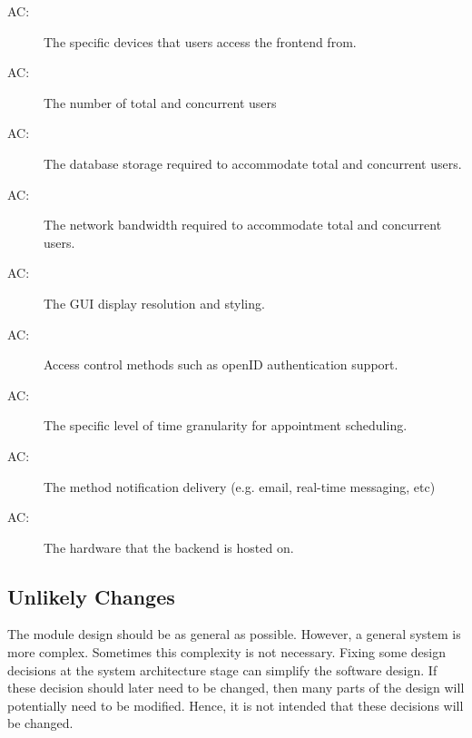 \documentclass[12pt, titlepage]{article}
\newcounter{acnum}
\newcommand{\actheacnum}{AC\theacnum}
\begin{document}
\begin{description}
\item[ \actheacnum \label{acDevice}:] The specific
  devices that users access the frontend from.
\item[ \actheacnum \label{acUsers}:] The number of total and concurrent users
\item[ \actheacnum \label{acStorage}:] The database storage required to accommodate total and concurrent users.
\item[ \actheacnum \label{acBandwidth}:] The network bandwidth required to accommodate total and concurrent users.
\item[ \actheacnum \label{acGUI}:] The GUI display resolution and styling.
\item[ \actheacnum \label{acAuth}:] Access control methods such as openID authentication support.
\item[ \actheacnum \label{acScheduling}:] The specific level of time granularity for appointment scheduling.
\item[ \actheacnum \label{acNotification}:] The method notification delivery (e.g. email, real-time messaging, etc)
\item[ \actheacnum \label{acHardware}:] The hardware that the backend is hosted on.
\end{description}

\subsection{Unlikely Changes} \label{SecUchange}

The module design should be as general as possible. However, a general system is
more complex. Sometimes this complexity is not necessary. Fixing some design
decisions at the system architecture stage can simplify the software design. If
these decision should later need to be changed, then many parts of the design
will potentially need to be modified. Hence, it is not intended that these
decisions will be changed.
\end{document}

